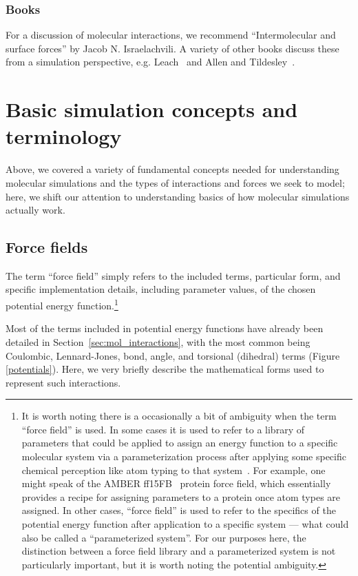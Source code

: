 \documentclass[9pt,bestpractices]{livecoms}
\begin{document}
\subsubsection{Books}
For a discussion of molecular interactions, we recommend ``Intermolecular and surface forces'' by Jacob N. Israelachvili.
A variety of other books discuss these from a simulation perspective, e.g. Leach~\cite{LeachBook} and Allen and Tildesley~\cite{allen_computer_2017}.


\section{Basic simulation concepts and terminology}
\label{sec:basics}

Above, we covered a variety of fundamental concepts needed for understanding molecular simulations and the types of interactions and forces we seek to model; here, we shift our attention to understanding basics of how molecular simulations actually work.

\subsection{Force fields}
\label{sec:force_fields}

The term ``force field'' simply refers to the included terms, particular form, and specific implementation details, including parameter values, of the chosen potential energy function.\footnote{It is worth noting there is a occasionally a bit of ambiguity when the term ``force field'' is used.
In some cases it is used to refer to a library of parameters that could be applied to assign an energy function to a specific molecular system via a parameterization process after applying some specific chemical perception like atom typing to that system~\cite{Mobley:2018:bioRxiv}.
For example, one might speak of the AMBER ff15FB~\citep{amber15FB} protein force field, which essentially provides a recipe for assigning parameters to a protein once atom types are assigned.
In other cases, ``force field'' is used to refer to the specifics of the potential energy function after application to a specific system --- what could also be called a ``parameterized system''. 
For our purposes here, the distinction between a force field library and a parameterized system is not particularly important, but it is worth noting the potential ambiguity. }

Most of the terms included in potential energy functions have already been detailed in Section~\ref{sec:mol_interactions}, with the most common being Coulombic, Lennard-Jones, bond, angle, and torsional (dihedral) terms (Figure \ref{potentials}). 
Here, we very briefly describe the mathematical forms used to represent such interactions.
\end{document}
